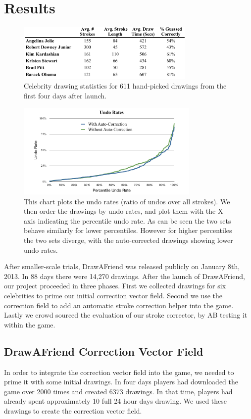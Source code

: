 \section{Results}
\begin{figure}
  \centering%
\includegraphics[height=1.1in]{./figures/daf-stats-cropped.pdf}
  \caption{Celebrity drawing statistics for 611 hand-picked drawings from the first four days after launch.}
  \label{fig:daf-stats}
\end{figure}


\begin{figure}
  \centering%
\includegraphics[width=3.5in]{./figures/userstudy/undoRates_chart_cropped.pdf}
  \caption{This chart plots the undo rates (ratio of undos over all strokes). We then order the drawings by undo rates, and plot them with the X axis indicating the percentile undo rate. As can be seen the two sets behave similarly for lower percentiles. However for higher percentiles the two sets diverge, with the auto-corrected drawings showing lower undo rates.}
  \label{fig:daf-undos}
\end{figure}



After smaller-scale trials, DrawAFriend was released publicly on January 8th, 2013. In 88 days there were 14,270 drawings. After the launch of DrawAFriend, our project proceeded in three phases. First we collected drawings for six celebrities to prime our initial correction vector field. Second we use the correction field to add an automatic stroke correction helper into the game. Lastly we crowd sourced the evaluation of our stroke corrector, by AB testing it within the game.

\subsection{DrawAFriend Correction Vector Field}
In order to integrate the correction vector field into the game, we needed to prime it with some initial drawings. In four days players had downloaded the game over 2000 times and created 6373 drawings. In that time, players had already spent approximately 10 full 24 hour days drawing. We used these drawings to create the correction vector field.


